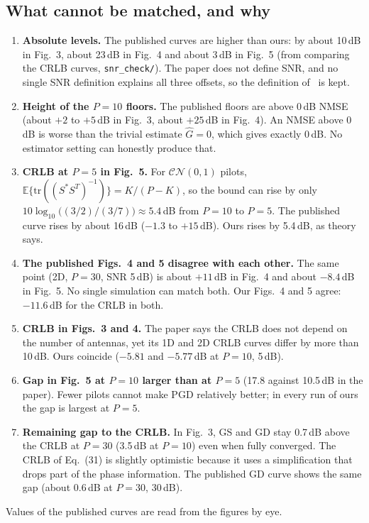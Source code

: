 \documentclass[11pt,a4paper]{article}
\newcommand{\file}[1]{\texttt{#1}}
\newcommand{\E}{\mathbb{E}}
\begin{document}
\subsection{What cannot be matched, and why}
\begin{enumerate}[leftmargin=*,itemsep=2pt]
  \item \textbf{Absolute levels.} The published curves are higher than ours: by about 10\,dB in
        Fig.~3, about 23\,dB in Fig.~4 and about 3\,dB in Fig.~5 (from comparing the CRLB curves,
        \file{snr\_check/}). The paper does not define SNR, and no single SNR definition explains
        all three offsets, so the definition of~\cite{cui2024} is kept.
  \item \textbf{Height of the $P=10$ floors.} The published floors are above 0\,dB NMSE (about
        $+2$ to $+5$\,dB in Fig.~3, about $+25$\,dB in Fig.~4). An NMSE above 0\,dB is worse than
        the trivial estimate $\hat G=0$, which gives exactly 0\,dB. No estimator setting can
        honestly produce that.
  \item \textbf{CRLB at $P=5$ in Fig.~5.} For $\mathcal{CN}(0,1)$ pilots,
        $\E\{\mathrm{tr}((S^*S^T)^{-1})\}=K/(P-K)$, so the bound can rise by only
        $10\log_{10}\big((3/2)/(3/7)\big)\approx5.4$\,dB from $P=10$ to $P=5$. The published curve
        rises by about 16\,dB ($-1.3$ to $+15$\,dB). Ours rises by 5.4\,dB, as theory says.
  \item \textbf{The published Figs.~4 and 5 disagree with each other.} The same point
        (2D, $P=30$, SNR 5\,dB) is about $+11$\,dB in Fig.~4 and about $-8.4$\,dB in Fig.~5. No
        single simulation can match both. Our Figs.~4 and 5 agree: $-11.6$\,dB for the CRLB in both.
  \item \textbf{CRLB in Figs.~3 and 4.} The paper says the CRLB does not depend on the number of
        antennas, yet its 1D and 2D CRLB curves differ by more than 10\,dB. Ours coincide
        ($-5.81$ and $-5.77$\,dB at $P=10$, 5\,dB).
  \item \textbf{Gap in Fig.~5 at $P=10$ larger than at $P=5$} (17.8 against 10.5\,dB in the paper).
        Fewer pilots cannot make PGD relatively better; in every run of ours the gap is largest at
        $P=5$.
  \item \textbf{Remaining gap to the CRLB.} In Fig.~3, GS and GD stay 0.7\,dB above the CRLB at
        $P=30$ (3.5\,dB at $P=10$) even when fully converged. The CRLB of Eq.~(31) is slightly
        optimistic because it uses a simplification that drops part of the phase information.
        The published GD curve shows the same gap (about 0.6\,dB at $P=30$, 30\,dB).
\end{enumerate}
Values of the published curves are read from the figures by eye.
\end{document}
